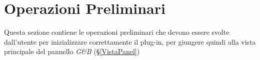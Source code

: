 \section{Operazioni Preliminari}
Questa sezione contiene le operazioni preliminari che devono essere svolte dall'utente per inizializzare correttamente il plug-in, per giungere quindi alla vista principale del pannello \textit{G\&B} (§\ref{VistaPanel})



